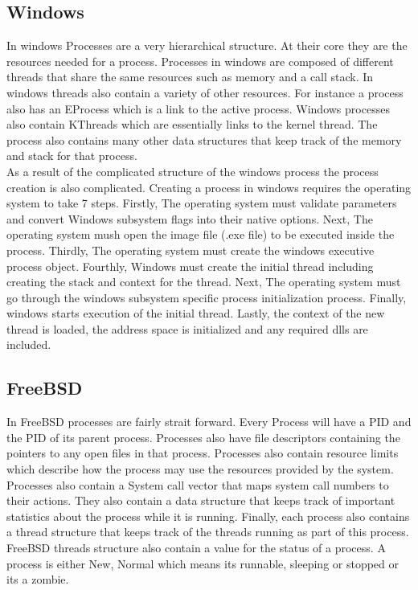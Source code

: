 \documentclass[letterpaper, onecolumn,10pt]{IEEEtran}
\begin{document}
			\subsection{Windows}
			In windows Processes are a very hierarchical structure. At their core they are the resources needed for a process. Processes in windows are composed of different threads that share the same resources such as memory and a call stack. In windows threads also contain a variety of other resources. For instance a process also has an EProcess which is a link to the active process. Windows processes also contain KThreads which are essentially links to the kernel thread. The process also contains many other data structures that keep track of the memory and stack for that process.\cite{Windows}\\
			
			As a result of the complicated structure of the windows process the process creation is also complicated. Creating a process in windows requires the operating system to take 7 steps. Firstly, The operating system must validate parameters and convert Windows subsystem flags into their native options. Next, The operating system mush open the image file (.exe file) to be executed inside the process. Thirdly, The operating system must create the windows executive process object. Fourthly, Windows must create the initial thread including creating the stack and context for the thread. Next, The operating system must go through the windows subsystem specific process initialization process. Finally, windows starts execution of the initial thread. Lastly, the context of the new thread is loaded, the address space is initialized and any required dlls are included\cite{Windows}.\\
			
			
			\subsection{FreeBSD}
			In FreeBSD processes are fairly strait forward. Every Process will have a PID and the PID of its parent process. Processes also have file descriptors containing the pointers to any open files in that process. Processes also contain resource limits which describe how the process may use the resources provided by the system. Processes also contain a System call vector that maps system call numbers to their actions. They also contain a data structure that keeps track of important statistics about the process while it is running. Finally, each process also contains a thread structure that keeps track of the threads running as part of this process. FreeBSD threads structure also contain a value for the status of a process. A process is either New, Normal which means its runnable, sleeping or stopped or its a zombie.\\
			
\end{document}
